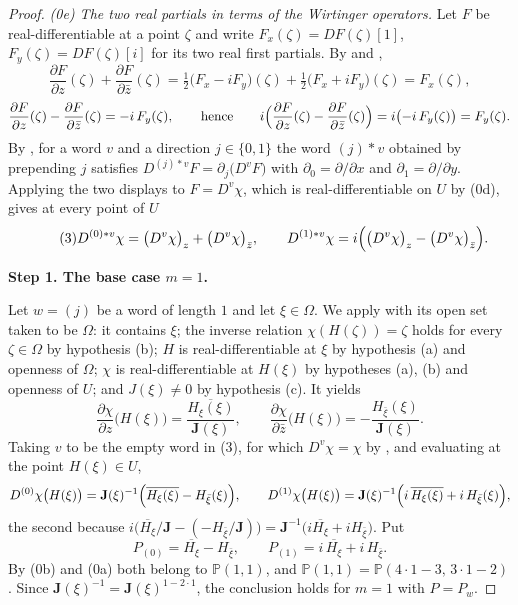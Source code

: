 \begin{proof}
\emph{(0e) The two real partials in terms of the Wirtinger operators.}  Let $F$
be real-differentiable at a point $\zeta$ and write $F_x(\zeta)=DF(\zeta)[1]$,
$F_y(\zeta)=DF(\zeta)[i]$ for its two real first partials.  By  and
,
\[
  \frac{\partial F}{\partial z}(\zeta)+\frac{\partial F}{\partial\bar z}(\zeta)
  =\tfrac12\bigl(F_x-iF_y\bigr)(\zeta)+\tfrac12\bigl(F_x+iF_y\bigr)(\zeta)
  =F_x(\zeta),
\]
\[
  \frac{\partial F}{\partial z}(\zeta)-\frac{\partial F}{\partial\bar z}(\zeta)
  =-i\,F_y(\zeta),
  \qquad\text{hence}\qquad
  i\Bigl(\frac{\partial F}{\partial z}(\zeta)-\frac{\partial F}{\partial\bar z}(\zeta)\Bigr)
  =i\bigl(-i\,F_y(\zeta)\bigr)=F_y(\zeta).
\]
By , for a word $v$ and a direction $j\in\{0,1\}$ the word
$(j)*v$ obtained by prepending $j$ satisfies
$D^{(j)*v}F=\partial_j\bigl(D^{v}F\bigr)$ with $\partial_0=\partial/\partial x$
and $\partial_1=\partial/\partial y$.  Applying the two displays to
$F=D^{v}\chi$, which is real-differentiable on $U$ by (0d), gives at every
point of $U$
\begin{equation}\tag{3}
  D^{(0)*v}\chi=\bigl(D^{v}\chi\bigr)_z+\bigl(D^{v}\chi\bigr)_{\bar z},
  \qquad
  D^{(1)*v}\chi=i\Bigl(\bigl(D^{v}\chi\bigr)_z-\bigl(D^{v}\chi\bigr)_{\bar z}\Bigr).
\end{equation}

\medskip
\noindent\textbf{Step 1.  The base case $m=1$.}

Let $w=(j)$ be a word of length $1$ and let $\xi\in\Omega$.  We apply
 with its open set taken to be $\Omega$: it contains
$\xi$; the inverse relation $\chi(H(\zeta))=\zeta$ holds for every
$\zeta\in\Omega$ by hypothesis (b); $H$ is real-differentiable at $\xi$ by
hypothesis (a) and openness of $\Omega$; $\chi$ is real-differentiable at
$H(\xi)$ by hypotheses (a), (b) and openness of $U$; and $J(\xi)\neq0$ by
hypothesis (c).  It yields
\[
  \frac{\partial\chi}{\partial z}\bigl(H(\xi)\bigr)=\frac{\overline{H_\xi(\xi)}}{\mathbf{J}(\xi)},
  \qquad
  \frac{\partial\chi}{\partial\bar z}\bigl(H(\xi)\bigr)=-\frac{H_{\bar\xi}(\xi)}{\mathbf{J}(\xi)} .
\]
Taking $v$ to be the empty word in (3), for which $D^{v}\chi=\chi$ by
, and evaluating at the point $H(\xi)\in U$,
\[
  D^{(0)}\chi\bigl(H(\xi)\bigr)
  =\mathbf{J}(\xi)^{-1}\Bigl(\overline{H_\xi(\xi)}-H_{\bar\xi}(\xi)\Bigr),
  \qquad
  D^{(1)}\chi\bigl(H(\xi)\bigr)
  =\mathbf{J}(\xi)^{-1}\Bigl(i\,\overline{H_\xi(\xi)}+i\,H_{\bar\xi}(\xi)\Bigr),
\]
the second because
$i\bigl(\overline{H_\xi}/\mathbf{J}-(-H_{\bar\xi}/\mathbf{J})\bigr)
 =\mathbf{J}^{-1}\bigl(i\overline{H_\xi}+iH_{\bar\xi}\bigr)$.
Put
\[
  P_{(0)}=\overline{H_\xi}-H_{\bar\xi},
  \qquad
  P_{(1)}=i\,\overline{H_\xi}+i\,H_{\bar\xi} .
\]
By (0b) and (0a) both belong to $\mathbb{P}(1,1)$, and
$\mathbb{P}(1,1)=\mathbb{P}(4\cdot1-3,\,3\cdot1-2)$.  Since
$\mathbf{J}(\xi)^{-1}=\mathbf{J}(\xi)^{1-2\cdot1}$, the conclusion holds for
$m=1$ with $P=P_{w}$.


\end{proof}
